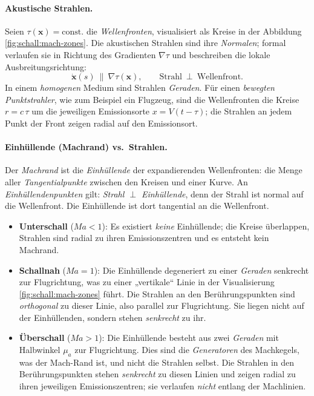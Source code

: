 \paragraph{Akustische Strahlen.}
Seien $\tau(\mathbf{x})=\mathrm{const.}$ die \emph{Wellenfronten}, visualisiert
als Kreise in der Abbildung \ref{fig:schall:mach-zones}.
Die akustischen Strahlen sind ihre \emph{Normalen}; formal verlaufen sie
in Richtung des Gradienten $\nabla\tau$ und beschreiben die lokale
Ausbreitungsrichtung:
\[
    \dot{\mathbf{x}}(s)\ \parallel\ \nabla\tau(\mathbf{x}),\qquad
    \text{Strahl}\ \perp\ \text{Wellenfront}.
\]
In einem \emph{homogenen} Medium sind Strahlen \emph{Geraden}.
Für einen \emph{bewegten Punktstrahler}, wie zum Beispiel ein Flugzeug,
sind die Wellenfronten die Kreise $r=c\,\tau$ um die jeweiligen Emissionsorte
$x=V(t-\tau)$; die Strahlen an jedem Punkt der Front zeigen radial auf den Emissionsort.

\paragraph{Einhüllende (Machrand) vs.\ Strahlen.}
Der \emph{Machrand} ist die \emph{Einhüllende} der expandierenden Wellenfronten:
die Menge aller \emph{Tangentialpunkte} zwischen den Kreisen und einer Kurve.
An \emph{Einhüllendenpunkten} gilt: \emph{Strahl $\perp$ Einhüllende},
denn der Strahl ist normal auf die Wellenfront.
Die Einhüllende ist dort tangential an die Wellenfront.

\begin{itemize}
\item \textbf{Unterschall} ($\textit{Ma}<1$):
Es existiert \emph{keine} Einhüllende; die Kreise überlappen, Strahlen
sind radial zu ihren Emissionszentren und es entsteht kein Machrand.

\item \textbf{Schallnah} ($\textit{Ma}=1$):
Die Einhüllende degeneriert zu einer \emph{Geraden} senkrecht zur Flugrichtung,
was zu einer „vertikale“ Linie in der Visualisierung \ref{fig:schall:mach-zones} führt.
Die Strahlen an den Berührungspunkten sind \emph{orthogonal} zu dieser Linie,
also parallel zur Flugrichtung.
Sie liegen nicht auf der Einhüllenden, sondern stehen \emph{senkrecht} zu ihr.

\item \textbf{Überschall} ($\textit{Ma}>1$):
Die Einhüllende besteht aus zwei \emph{Geraden} mit Halbwinkel $\mu_a$ zur Flugrichtung.
Dies sind die \emph{Generatoren} des Machkegels, was der Mach-Rand ist,
und nicht die Strahlen selbst.
Die Strahlen in den Berührungspunkten stehen \emph{senkrecht} zu
diesen Linien und zeigen radial zu ihren jeweiligen Emissionszentren;
sie verlaufen \emph{nicht} entlang der Machlinien.
\end{itemize}

